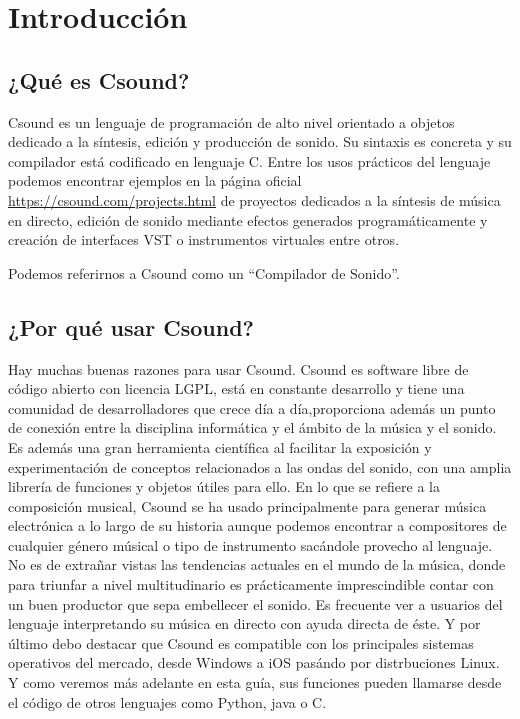 
\chapter{Introducción}\label{cap1}
\section{¿Qué es Csound?}\label{sec:intro}

Csound es un lenguaje de programación de alto nivel orientado a objetos dedicado a la síntesis, edición y producción de sonido. Su sintaxis es concreta y su compilador está codificado en lenguaje C. Entre los usos prácticos del lenguaje podemos encontrar ejemplos en la página oficial \url{https://csound.com/projects.html} de proyectos dedicados a la síntesis de música en directo, edición de sonido mediante efectos generados programáticamente y creación de interfaces VST o instrumentos virtuales entre otros.

Podemos referirnos a Csound como un ``Compilador de Sonido''.

\section{¿Por qué usar Csound?}\label{sec:intro}

Hay muchas buenas razones para usar Csound. Csound es software libre de código abierto con licencia LGPL, está en constante desarrollo y tiene una comunidad de desarrolladores que crece día a día,proporciona además un punto de conexión entre la disciplina informática y el ámbito de la música y el sonido. 
Es además una gran herramienta científica al facilitar la exposición y experimentación de conceptos relacionados a las ondas del sonido, con una amplia librería de funciones y objetos útiles para ello. 
En lo que se refiere a la composición musical, Csound se ha usado principalmente para generar música electrónica a lo largo de su historia aunque podemos encontrar a compositores de cualquier género músical o tipo de instrumento sacándole provecho al lenguaje. No es de extrañar vistas las tendencias actuales en el mundo de la música, donde para triunfar a nivel multitudinario es prácticamente imprescindible contar con un buen productor que sepa embellecer el sonido.
Es frecuente ver a usuarios del lenguaje interpretando su música en directo con ayuda directa de éste.
Y por último debo destacar que Csound es compatible con los principales sistemas operativos del mercado, desde Windows a iOS pasándo por distrbuciones Linux. Y como veremos más adelante en esta guía, sus funciones pueden llamarse desde el código de otros lenguajes como Python, java o C.
\pagebreak

